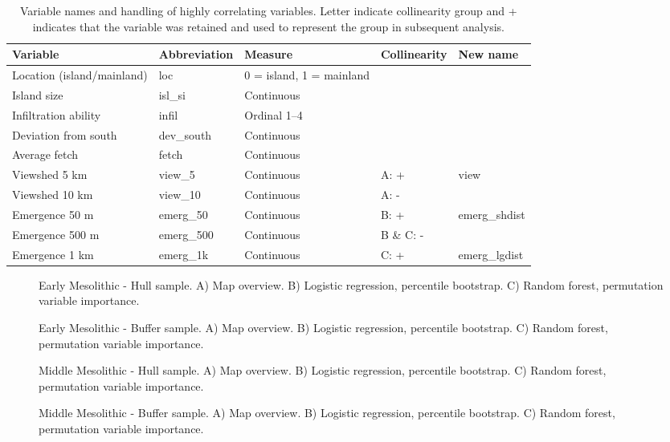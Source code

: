 \documentclass[12pt, a4paper]{article}
\begin{document}
\begin{table}
	\hskip-2.0cm\begin{tabular}{ | l | l | l | l | l |}
		\hline
		Variable & Abbreviation & Measure & Collinearity & New name \\ \hline
		Location (island/mainland) & loc & 0 = island, 1 = mainland &&  \\ \hline
		Island size & isl\_si & Continuous && \\ \hline
		Infiltration ability & infil & Ordinal 1--4 &&\\ \hline
		Deviation from south & dev\_south & Continuous &&\\ \hline
		Average fetch & fetch &  Continuous &&\\ \hline
		Viewshed 5 km &  view\_5  & Continuous & A: + & view \\ \hline
		Viewshed 10 km &  view\_10  & Continuous & A: - &\\ \hline
		Emergence 50 m  & emerg\_50 & Continuous & B: + & emerg\_shdist \\ \hline
		Emergence 500 m & emerg\_500 & Continuous & B \& C: - &  \\ \hline
		Emergence 1 km & emerg\_1k & Continuous & C: + & emerg\_lgdist \\ \hline
		\hline
	\end{tabular}
	\caption[Variable names and handling of highly correlating variables.]{Variable names and handling of highly correlating variables. Letter indicate collinearity group and + indicates that the variable was retained and used to represent the group in subsequent analysis.}
	\label{table:var}
\end{table}

\begin{figure}
	\caption[Early Mesolithic - Hull sample]{Early Mesolithic - Hull sample. A) Map overview. B) Logistic regression, percentile bootstrap. C) Random forest, permutation variable importance.}
	\label{fig:em_hull}
\bigbreak
	\caption[Early Mesolithic - Buffer sample]{Early Mesolithic - Buffer sample. A) Map overview. B) Logistic regression, percentile bootstrap. C) Random forest, permutation variable importance.}
	\label{fig:em_buff}
\end{figure}

\begin{figure}
	\caption[Middle Mesolithic - Hull sample]{Middle Mesolithic - Hull sample. A) Map overview. B) Logistic regression, percentile bootstrap. C) Random forest, permutation variable importance.}
	\label{fig:mm_hull}
\bigbreak
	\caption[Middle Mesolithic - Buffer sample]{Middle Mesolithic - Buffer sample. A) Map overview. B) Logistic regression, percentile bootstrap. C) Random forest, permutation variable importance.}
	\label{fig:mm_buff}
\end{figure}
	
\end{document}

